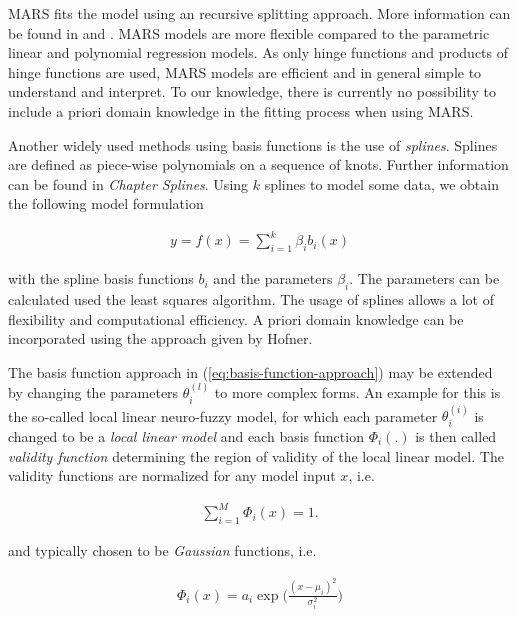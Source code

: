 \documentclass[10pt,a4paper]{article}
\begin{document}
MARS fits the model using an recursive splitting approach. More information can be found in \cite{friedman1991multivariate} and \cite{friedman2001elements}. MARS models are more flexible compared to the parametric linear and polynomial regression models. As only hinge functions and products of hinge functions are used, MARS models are efficient and in general simple to understand and interpret. To our knowledge, there is currently no possibility to include a priori domain knowledge in the fitting process when using MARS. 

Another widely used methods using basis functions is the use of \emph{splines}. Splines are defined as piece-wise polynomials on a sequence of knots. Further information can be found in \emph{Chapter Splines}. \cite{deBoor1978practicalGuideToSplines} Using $k$ splines to model some data, we obtain the following model formulation

\begin{align} \label{eq:Spline-basis-formulation}
	y = f(x) = \sum_{i=1}^k \beta_i b_i(x) 
\end{align}

with the spline basis functions $b_i$ and the parameters $\beta_i$. The parameters can be calculated used the least squares algorithm. The usage of splines allows a lot of flexibility and computational efficiency. A priori domain knowledge can be incorporated using the approach given by Hofner.\cite{hofner2011monotonicity}

The basis function approach in (\ref{eq:basis-function-approach}) may be extended by changing the parameters $\theta_i^{(l)}$ to more complex forms. An example for this is the so-called local linear neuro-fuzzy model, for which each parameter $\theta_i^{(i)}$ is changed to be a \emph{local linear model} and each basis function $\Phi_i(.)$ is then called \emph{validity function} determining the region of validity of the local linear model. \cite{nelles2013nonlinear} The validity functions are normalized for any model input $x$, i.e.

\begin{align} \label{eq:LILOMOT-normalized-basis-fucntions}
	\sum_{i=1}^M \Phi_i(x) = 1.
\end{align}

and typically chosen to be \emph{Gaussian} functions, i.e. 

\begin{align} \label{eq:validity-function}
	\Phi_i(x) = a_i \exp \big(\frac{(x - \mu_i)^2}{\sigma_i^2} \big)	
\end{align}
\end{document}
